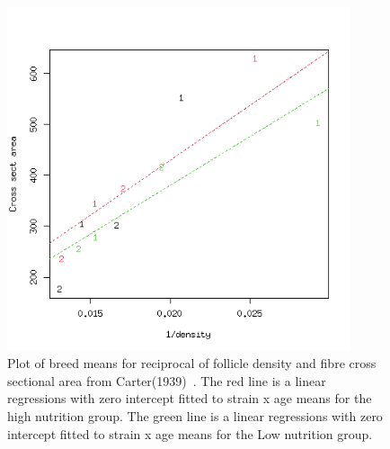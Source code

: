 %

\begin{figure}[h]
  \centering
   \includegraphics[width=0.9\textwidth]{C19391951/strainxnut.png}
  \caption{Plot of breed means for reciprocal of follicle density and fibre cross sectional area from Carter(1939)~\cite{cart:39}. The red line is a linear regressions  with zero intercept fitted to strain x age means for the high nutrition group. The green line is a linear regressions with zero intercept fitted to strain x age means for the Low nutrition group.}
  \label{fig:oldcart1}
\end{figure}

%


